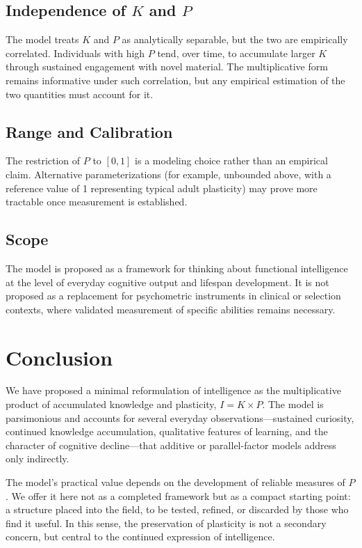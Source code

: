 \documentclass[11pt, a4paper]{article}
\begin{document}
\subsection{Independence of $K$ and $P$}

The model treats $K$ and $P$ as analytically separable, but the two are empirically correlated. Individuals with high $P$ tend, over time, to accumulate larger $K$ through sustained engagement with novel material. The multiplicative form remains informative under such correlation, but any empirical estimation of the two quantities must account for it.

\subsection{Range and Calibration}

The restriction of $P$ to $[0, 1]$ is a modeling choice rather than an empirical claim. Alternative parameterizations (for example, unbounded above, with a reference value of 1 representing typical adult plasticity) may prove more tractable once measurement is established.

\subsection{Scope}

The model is proposed as a framework for thinking about functional intelligence at the level of everyday cognitive output and lifespan development. It is not proposed as a replacement for psychometric instruments in clinical or selection contexts, where validated measurement of specific abilities remains necessary.

\section{Conclusion}

We have proposed a minimal reformulation of intelligence as the multiplicative product of accumulated knowledge and plasticity, $I = K \times P$. The model is parsimonious and accounts for several everyday observations---sustained curiosity, continued knowledge accumulation, qualitative features of learning, and the character of cognitive decline---that additive or parallel-factor models address only indirectly.

The model's practical value depends on the development of reliable measures of $P$. We offer it here not as a completed framework but as a compact starting point: a structure placed into the field, to be tested, refined, or discarded by those who find it useful. In this sense, the preservation of plasticity is not a secondary concern, but central to the continued expression of intelligence.
\end{document}
